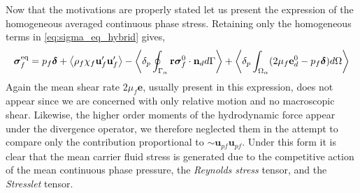 Now that the motivations are properly stated let us present the expression of the homogeneous averaged continuous phase stress. 
Retaining only the homogeneous terms in \ref{eq:sigma_eq_hybrid} gives, 
\begin{equation}
    \bm{\sigma}^\text{eq}_f = 
    p_f \bm\delta 
    +\avg{\rho_f\chi_f\textbf{u}_f'\textbf{u}_f'}
    - \pSavg{\textbf{r}\bm{\sigma}_f^0\cdot \textbf{n}_d}
    +  \pOavg{(2 \mu_f \textbf{e}_d^0 - p_f\bm\delta)}
    \label{eq:sigma_eq_f}
\end{equation} 
Again the mean shear rate $2\mu_f\textbf{e}$, usually present in this expression, does not appear since we are concerned with only relative motion and no macroscopic shear. 
Likewise, the higher order moments of the hydrodynamic force appear under the divergence operator, we therefore neglected them in the attempt to compare only the contribution proportional to $\sim \textbf{u}_{pf}\textbf{u}_{pf}$. 
Under this form it is clear that the mean carrier fluid stress is generated due to the competitive action of the mean continuous phase pressure, the \textit{Reynolds stress} tensor, and the \textit{Stresslet} tensor. 

